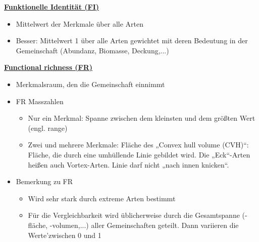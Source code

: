 \underline{\textbf{Funktionelle Identität (FI)}}
\begin{itemize}
	\item Mittelwert der Merkmale über alle Arten
	\item Besser: Mittelwert 1 über alle Arten gewichtet mit deren Bedeutung in der Gemeinschaft (Abundanz, Biomasse, Deckung,...)
\end{itemize}

\underline{\textbf{Functional richness (FR)}}\\
\begin{itemize}
	\item Merkmalsraum, den die Gemeinschaft einnimmt
	\item FR Masszahlen
	\begin{itemize}
		\item Nur ein Merkmal: Spanne zwischen dem kleinsten und dem größten Wert (engl. range)
		\item Zwei und mehrere Merkmale: Fläche des „Convex hull volume (CVH)“: Fläche, die durch eine umhüllende Linie gebildet wird. Die „Eck“-Arten heißen auch Vortex-Arten. Linie darf nicht „nach innen knicken“.
	\end{itemize}
	\item Bemerkung zu FR
	\begin{itemize}
		\item Wird sehr stark durch extreme Arten bestimmt
		\item Für die Vergleichbarkeit wird üblicherweise durch die Gesamtspanne (-fläche, -volumen,...) aller Gemeinschaften geteilt. Dann variieren die Werte'zwischen 0 und 1
	\end{itemize}
\end{itemize}